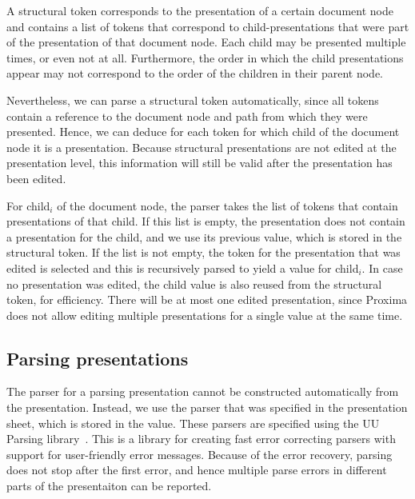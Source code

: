\documentclass[12pt]{article}
\begin{document}
A structural token corresponds to the presentation of a certain document node and contains a list of tokens that correspond to child-presentations that were part of the presentation of that document node. Each child may be presented multiple times, or even not at all. Furthermore, the order in which the child presentations appear may not correspond to the order of the children in their parent node.

Nevertheless, we can parse a structural token automatically, since all tokens contain a  reference to the document node and path from which they were presented. Hence, we can deduce for each token for which child of the document node it is a presentation. Because structural presentations are not edited at the presentation level, this information will still be valid after the presentation has been edited. 

For child$_i$ of the document node, the parser takes the list of tokens that contain presentations of that child. If this list is empty, the presentation does not contain a presentation for the child, and we use its previous value, which is stored in the structural token. If the list is not empty, the token for the presentation that was edited is selected and this is recursively parsed to yield a value for child$_i$. In case no presentation was edited, the child value is also reused from the structural token, for efficiency. There will be at most one edited presentation, since Proxima does not allow editing multiple presentations for a single value at the same time. 




\subsection{Parsing presentations}

The parser for a parsing presentation cannot be constructed automatically from the presentation. Instead, we use the parser that was specified in the presentation sheet, which is stored in the  value. These parsers are specified using the UU Parsing library~\cite{swierstra03polishParsers, swierstra08parserCombinators}. This is a library for creating fast error correcting parsers with support for user-friendly error messages. Because of the error recovery, parsing does not stop after the first error, and hence multiple parse errors in different parts of the presentaiton can be reported. 
\end{document}
